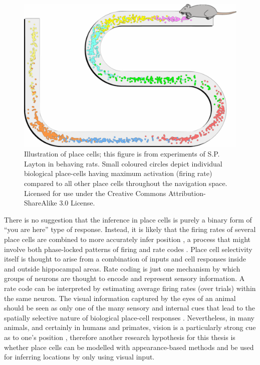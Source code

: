 \begin{figure}[!t]
\centering
\includegraphics[width=.6\linewidth]{./gfx/Chapter01/bio_place_cells_rat.pdf}
\caption{Illustration of place cells; this figure is from experiments of S.P. Layton in behaving rats. Small coloured circles depict individual biological place-cells having maximum activation (firing rate) compared to all other place cells throughout the navigation space. Licensed for use under the Creative Commons Attribution-ShareAlike 3.0 License.}
\label{fig:Maze}
\end{figure}

There is no suggestion that the inference in place cells is purely a binary form of ``you are here'' type of response.  Instead, it is likely that the firing rates of several place cells are combined to more accurately infer position \cite{hafting2005microstructure}, a process that might involve both phase-locked patterns of firing and rate codes \cite{dragoi2006temporal}. Place cell selectivity itself is thought to arise from a combination of inputs and cell responses inside and outside hippocampal areas. Rate coding \cite{van2001rate} is just one mechanism by which groups of neurons are thought to encode and represent sensory information. A rate code can be interpreted by estimating average firing rates (over trials) within the same neuron. %
The visual information captured by the eyes of an animal should be seen as only one of the many sensory and internal cues that lead to the spatially selective nature of biological place-cell responses \cite{hassabis2009decoding}. Nevertheless, in many animals, and certainly in humans and primates, vision is a particularly strong cue as to one's position \cite{epstein1998cortical}, therefore another research hypothesis for this thesis is whether place cells can be modelled with appearance-based methods and be used for inferring locations by only using visual input.


